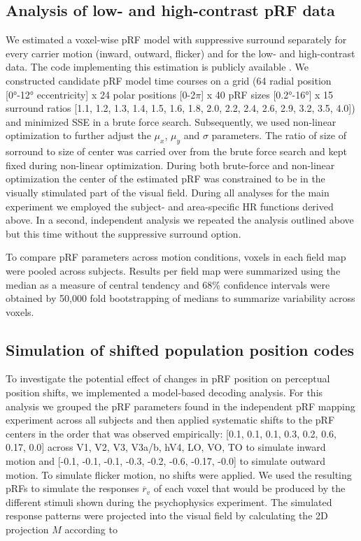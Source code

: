 \subsection{Analysis of low- and high-contrast pRF data}
We estimated a voxel-wise pRF model with suppressive surround separately for every carrier motion (inward, outward, flicker) and for the low- and high-contrast data. The code implementing this estimation is publicly available \parencite{pyprf_feature}. We constructed candidate pRF model time courses on a grid (64 radial position [0°-12° eccentricity] x 24 polar positions [0-2$\pi$] x 40 pRF sizes [0.2°-16°] x 15 surround ratios [1.1, 1.2, 1.3, 1.4, 1.5, 1.6, 1.8, 2.0, 2.2, 2.4, 2.6, 2.9, 3.2, 3.5, 4.0]) and minimized SSE in a brute force search. Subsequently, we used non-linear optimization to further adjust the $\mu_x$, $\mu_y$ and $\sigma$ parameters. The ratio of size of sorround to size of center was carried over from the brute force search and kept fixed during non-linear optimization. During both brute-force and non-linear optimization the center of the estimated pRF was constrained to be in the visually stimulated part of the visual field. During all analyses for the main experiment we employed the subject- and area-specific HR functions derived above. In a second, independent analysis we repeated the analysis outlined above but this time without the suppressive surround option.

To compare pRF parameters across motion conditions, voxels in each field map were pooled across subjects. Results per field map were summarized using the median as a measure of central tendency and 68\% confidence intervals were obtained by 50,000 fold bootstrapping of medians to summarize variability across voxels.

\subsection{Simulation of shifted population position codes}
To investigate the potential effect of changes in pRF position on perceptual position shifts, we implemented a model-based decoding analysis. For this analysis we grouped the pRF parameters found in the independent pRF mapping experiment across all subjects and then applied systematic shifts to the pRF centers in the order that was observed empirically: [0.1, 0.1, 0.1, 0.3, 0.2, 0.6, 0.17, 0.0] across V1, V2, V3, V3a/b, hV4, LO, VO, TO to simulate inward motion and [-0.1, -0.1, -0.1, -0.3, -0.2, -0.6, -0.17, -0.0] to simulate outward motion. To simulate flicker motion, no shifts were applied. We used the resulting pRFs to simulate the responses $\overline{r}_v$ of each voxel that would be produced by the different stimuli shown during the psychophysics experiment. The simulated response patterns were projected into the visual field by calculating the 2D projection $M$ according to

